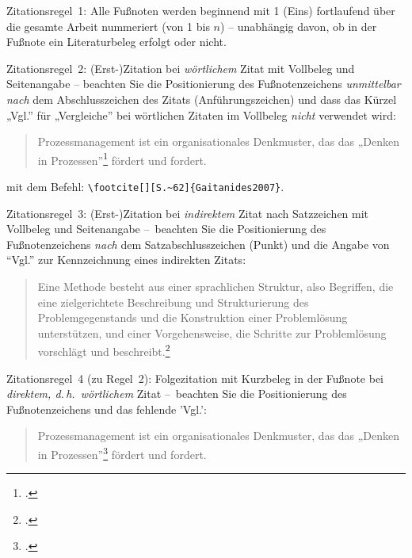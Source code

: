 Zitationsregel~1: Alle Fußnoten werden beginnend mit 1 (Eins) fortlaufend über die gesamte Arbeit nummeriert (von 1 bis $n$) -- unabhängig davon, ob in der Fußnote ein Literaturbeleg erfolgt oder nicht. 


Zitationsregel~2: (Erst-)Zitation bei \emph{wörtlichem} Zitat mit Vollbeleg und Seitenangabe -- beachten Sie die Positionierung des Fußnotenzeichens \emph{unmittelbar nach} dem Abschlusszeichen des Zitats (Anführungszeichen) und dass das Kürzel „Vgl.” für „Vergleiche” bei wörtlichen Zitaten im Vollbeleg \emph{nicht} verwendet wird:

\begin{quote}
 Prozessmanagement ist ein organisationales Denkmuster, das das „Denken in Prozessen”\footcite[][S.~62]{Gaitanides2007} fördert und fordert.
\end{quote}

mit dem Befehl: \verb|\footcite[][S.~62]{Gaitanides2007}|.



Zitationsregel~3: (Erst-)Zitation bei \emph{indirektem} Zitat nach Satzzeichen mit Vollbeleg und Seitenangabe --~beachten Sie die Positionierung des Fußnotenzeichens \emph{nach} dem Satzabschlusszeichen (Punkt) und die Angabe von \enquote{Vgl.} zur Kennzeichnung eines indirekten Zitats:

\begin{quote}
Eine Methode besteht aus einer sprachlichen Struktur, also Begriffen, die eine zielgerichtete Beschreibung und Strukturierung des Problemgegenstands und die Konstruktion einer Problemlösung unterstützen, und einer Vorgehensweise, die Schritte zur Problemlösung vorschlägt und beschreibt.\footcite[Vgl.][S.~161f.]{Fran07Konfig}
\end{quote}



Zitationsregel~4 (zu Regel~2): Folgezitation mit Kurzbeleg in der Fußnote bei \emph{direktem, d.\,h.\ wörtlichem} Zitat --~beachten Sie die Positionierung des Fußnotenzeichens und das fehlende 'Vgl.':

\begin{quote}
 Prozessmanagement ist ein organisationales Denkmuster, das das „Denken in Prozessen”\footcite[][S.~62]{Gaitanides2007} fördert und fordert.
\end{quote}

